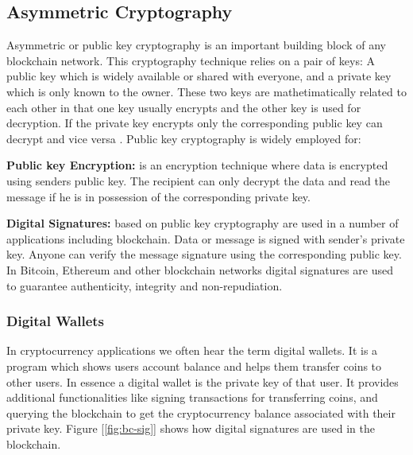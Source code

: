\subsection{Asymmetric Cryptography} \label{AC}
Asymmetric or public key cryptography is an important building block of any blockchain network. This cryptography technique relies on a pair of keys: A public key which is widely available or shared with everyone, and a private key which is only known to the owner. These two keys are mathetimatically related to each other in that one key usually encrypts and the other key is used for decryption. If the private key encrypts only the corresponding public key can decrypt and vice versa \cite{wiki:004}. Public key cryptography is widely employed for:

\textbf{Public key Encryption:} is an encryption technique where data is encrypted using senders public key. The recipient can only decrypt the data and read the message if he is in possession of the corresponding private key.

\textbf{Digital Signatures:} based on public key cryptography are used in a number of applications including blockchain. Data or message is signed with sender’s private key. Anyone can verify the message signature using the corresponding public key. In Bitcoin, Ethereum and other blockchain networks digital signatures are used to guarantee authenticity, integrity and non-repudiation.
\subsubsection{Digital Wallets}
In cryptocurrency applications we often hear the term digital wallets. It is a program which shows users account balance and helps them transfer coins to other users. In essence a digital wallet is the private key of that user. It provides additional functionalities like signing transactions for transferring coins, and querying the blockchain to get the cryptocurrency balance associated with their private key.  Figure [\ref{fig:bc-sig}] shows how digital signatures are used in the blockchain. 

